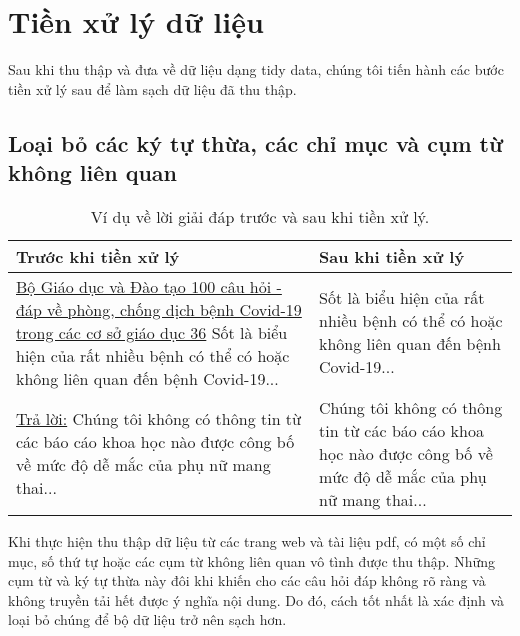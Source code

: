 \documentclass[runningheads]{llncs}
\begin{document}
\section{Tiền xử lý dữ liệu}
Sau khi thu thập và đưa về dữ liệu dạng tidy data, chúng tôi tiến hành các bước tiền xử lý sau để làm sạch dữ liệu đã thu thập.

\subsection{Loại bỏ các ký tự thừa, các chỉ mục và cụm từ không liên quan }
\vspace{-0.4cm}
\begin{table}
	\setlength{\tabcolsep}{0.5em}
	\renewcommand{\arraystretch}{1.4}
	\begin{center}
	\caption{Ví dụ về lời giải đáp trước và sau khi tiền xử lý.}\label{tab1}
		\begin{tabular}{ | p{5.75cm} | p{5.75cm} |} 
			\hline
    		\textbf{Trước khi tiền xử lý} & \textbf{Sau khi tiền xử lý}\\ 
			\hline
			\uline{Bộ Giáo dục và Đào tạo 100 câu hỏi - đáp về phòng, chống dịch bệnh Covid-19 trong các cơ sở giáo dục 36} Sốt là biểu hiện của rất nhiều bệnh có thể có hoặc không liên quan đến bệnh Covid-19...& Sốt là biểu hiện của rất nhiều bệnh có thể có hoặc không liên quan đến bệnh Covid-19... \\ 
			\hline
			\uline{Trả lời:} Chúng tôi không có thông tin từ các báo cáo khoa học nào được công bố về mức độ dễ mắc của phụ nữ mang thai...& Chúng tôi không có thông tin từ các báo cáo khoa học nào được công bố về mức độ dễ mắc của phụ nữ mang thai...\\
			\hline
			\end{tabular}
		\end{center}
\end{table}
\vspace{-0.8cm}
Khi thực hiện thu thập dữ liệu từ các trang web và tài liệu pdf, có một số chỉ mục, số thứ tự hoặc các cụm từ không liên quan vô tình được thu thập. Những cụm từ và ký tự thừa này đôi khi khiến cho các câu hỏi đáp không rõ ràng và không truyền tải hết được ý nghĩa nội dung. Do đó, cách tốt nhất là xác định và loại bỏ chúng để bộ dữ liệu trở nên sạch hơn.
\end{document}
